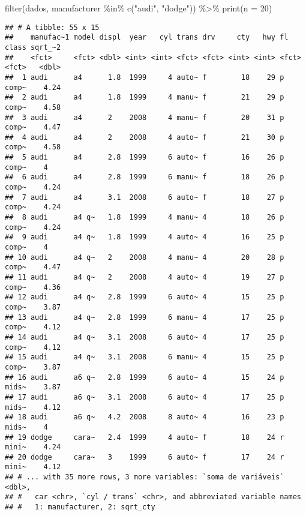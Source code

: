 \documentclass[
]{book}
\newenvironment{Shaded}{\begin{snugshade}}{\end{snugshade}}
\newcommand{\AttributeTok}[1]{\textcolor[rgb]{0.77,0.63,0.00}{#1}}
\newcommand{\DecValTok}[1]{\textcolor[rgb]{0.00,0.00,0.81}{#1}}
\newcommand{\FunctionTok}[1]{\textcolor[rgb]{0.00,0.00,0.00}{#1}}
\newcommand{\NormalTok}[1]{#1}
\newcommand{\SpecialCharTok}[1]{\textcolor[rgb]{0.00,0.00,0.00}{#1}}
\newcommand{\StringTok}[1]{\textcolor[rgb]{0.31,0.60,0.02}{#1}}
\begin{document}
\begin{Shaded}
\begin{Highlighting}[]
\FunctionTok{filter}\NormalTok{(dados, manufacturer }\SpecialCharTok{\%in\%} \FunctionTok{c}\NormalTok{(}\StringTok{"audi"}\NormalTok{, }\StringTok{"dodge"}\NormalTok{)) }\SpecialCharTok{\%\textgreater{}\%}
  \FunctionTok{print}\NormalTok{(}\AttributeTok{n =} \DecValTok{20}\NormalTok{)}
\end{Highlighting}
\end{Shaded}

\begin{verbatim}
## # A tibble: 55 x 15
##    manufac~1 model displ  year   cyl trans drv     cty   hwy fl    class sqrt_~2
##    <fct>     <fct> <dbl> <int> <int> <fct> <fct> <int> <int> <fct> <fct>   <dbl>
##  1 audi      a4      1.8  1999     4 auto~ f        18    29 p     comp~    4.24
##  2 audi      a4      1.8  1999     4 manu~ f        21    29 p     comp~    4.58
##  3 audi      a4      2    2008     4 manu~ f        20    31 p     comp~    4.47
##  4 audi      a4      2    2008     4 auto~ f        21    30 p     comp~    4.58
##  5 audi      a4      2.8  1999     6 auto~ f        16    26 p     comp~    4   
##  6 audi      a4      2.8  1999     6 manu~ f        18    26 p     comp~    4.24
##  7 audi      a4      3.1  2008     6 auto~ f        18    27 p     comp~    4.24
##  8 audi      a4 q~   1.8  1999     4 manu~ 4        18    26 p     comp~    4.24
##  9 audi      a4 q~   1.8  1999     4 auto~ 4        16    25 p     comp~    4   
## 10 audi      a4 q~   2    2008     4 manu~ 4        20    28 p     comp~    4.47
## 11 audi      a4 q~   2    2008     4 auto~ 4        19    27 p     comp~    4.36
## 12 audi      a4 q~   2.8  1999     6 auto~ 4        15    25 p     comp~    3.87
## 13 audi      a4 q~   2.8  1999     6 manu~ 4        17    25 p     comp~    4.12
## 14 audi      a4 q~   3.1  2008     6 auto~ 4        17    25 p     comp~    4.12
## 15 audi      a4 q~   3.1  2008     6 manu~ 4        15    25 p     comp~    3.87
## 16 audi      a6 q~   2.8  1999     6 auto~ 4        15    24 p     mids~    3.87
## 17 audi      a6 q~   3.1  2008     6 auto~ 4        17    25 p     mids~    4.12
## 18 audi      a6 q~   4.2  2008     8 auto~ 4        16    23 p     mids~    4   
## 19 dodge     cara~   2.4  1999     4 auto~ f        18    24 r     mini~    4.24
## 20 dodge     cara~   3    1999     6 auto~ f        17    24 r     mini~    4.12
## # ... with 35 more rows, 3 more variables: `soma de variáveis` <dbl>,
## #   car <chr>, `cyl / trans` <chr>, and abbreviated variable names
## #   1: manufacturer, 2: sqrt_cty
\end{verbatim}
\end{document}
